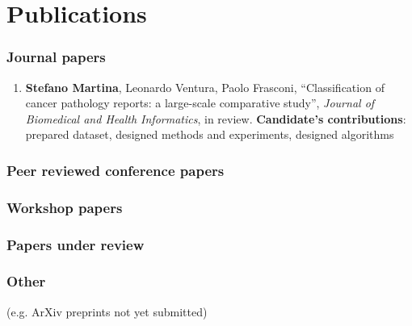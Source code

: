 \chapter{Publications}
\label{app:publications}

\subsection*{Journal papers}
\begin{enumerate}
\item \textbf{Stefano Martina}, Leonardo Ventura, Paolo Frasconi,
  ``Classification of cancer pathology reports: a large-scale comparative study'', \textit{Journal of Biomedical and Health Informatics}, in
  review.
  \textbf{Candidate's contributions}: prepared dataset, designed
  methods and experiments, designed algorithms
\end{enumerate}
\subsection*{Peer reviewed conference papers}
\subsection*{Workshop papers}
\subsection*{Papers under review}
\subsection*{Other}
(e.g. ArXiv preprints not yet submitted)


